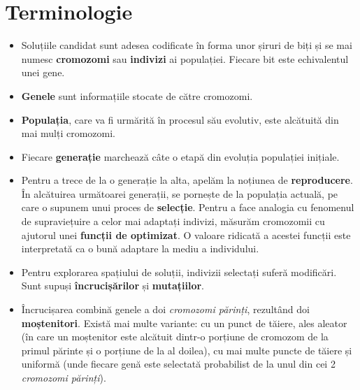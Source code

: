 \section{Terminologie}

\begin{itemize}
	
	 \item Soluțiile candidat sunt adesea codificate în forma unor șiruri de biți și se mai numesc \textbf{cromozomi} sau \textbf{indivizi} ai populației. Fiecare bit este echivalentul unei gene. 
	 
	 \item \textbf{Genele} sunt informațiile stocate de către cromozomi. 
	 
	 \item \textbf{Populația}, care va fi urmărită în procesul său evolutiv, este alcătuită din mai mulți cromozomi. 
	 
	 \item Fiecare \textbf{generație} marchează câte o etapă din evoluția populației inițiale. 
	 
	 \item Pentru a trece de la o generație la alta, apelăm la noțiunea de \textbf{reproducere}. În alcătuirea următoarei generații, se pornește de la populația actuală, pe care o supunem unui proces de \textbf{selecție}. Pentru a face analogia cu fenomenul de supraviețuire a celor mai adaptați indivizi, măsurăm cromozomii cu ajutorul unei \textbf{funcții de optimizat}. O valoare ridicată a acestei funcții este interpretată ca o bună adaptare la mediu a individului.  
	 
	 \item Pentru explorarea spațiului de soluții, indivizii selectați suferă modificări. Sunt supuși \textbf{încrucișărilor} și \textbf{mutațiilor}. 
	 
	 \item Încrucișarea combină genele a doi \textit{cromozomi părinți}, rezultând doi \textbf{moștenitori}. Există mai multe variante: cu un punct de tăiere, ales aleator (în care un moștenitor este alcătuit dintr-o porțiune de cromozom de la primul părinte și o porțiune de la al doilea), cu mai multe puncte de tăiere și uniformă (unde fiecare genă este selectată probabilist de la unul din cei 2 \textit{cromozomi părinți}). 
	 

\end{itemize}

